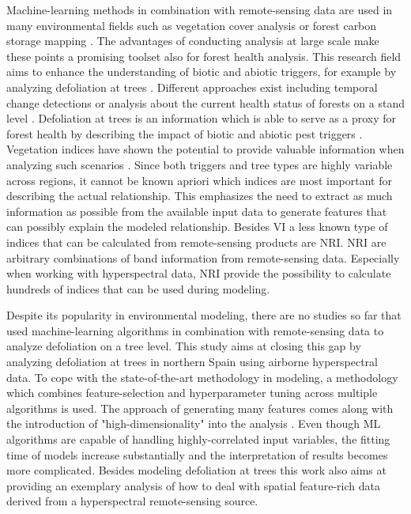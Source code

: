 \documentclass[review]{elsarticle}
\begin{document}
Machine-learning methods in combination with remote-sensing data are used in many environmental fields such as vegetation cover analysis or forest carbon storage mapping \citep{mascaro2014, urban2018}.
The advantages of conducting analysis at large scale make these points a promising toolset also for forest health analysis.
This research field aims to enhance the understanding of biotic and abiotic triggers, for example by analyzing defoliation at trees \citep{hawrylo2018}.
Different approaches exist including temporal change detections \citep{zhang2016} or analysis about the current health status of forests on a stand level \citep{townsend2012}.
Defoliation at trees is an information which is able to serve as a proxy for forest health by describing the impact of biotic and abiotic pest triggers \citep{townsend2012, goodbody2018}.
Vegetation indices have shown the potential to provide valuable information when analyzing such scenarios \citep{jiang2014, adamczyk2015}.
Since both triggers and tree types are highly variable across regions, it cannot be known apriori which indices are most important for describing the actual relationship.
This emphasizes the need to extract as much information as possible from the available input data to generate features that can possibly explain the modeled relationship.
Besides \ac{VI} a less known type of indices that can be calculated from remote-sensing products are \ac{NRI}.
\ac{NRI} are arbitrary combinations of band information from remote-sensing data.
Especially when working with hyperspectral data, \ac{NRI} provide the possibility to calculate hundreds of indices that can be used during modeling.


Despite its popularity in environmental modeling, there are no studies so far that used machine-learning algorithms in combination with remote-sensing data to analyze defoliation on a tree level.
This study aims at closing this gap by analyzing defoliation at trees in northern Spain using airborne hyperspectral data.
To cope with the state-of-the-art methodology in modeling, a methodology which combines feature-selection and hyperparameter tuning across multiple algorithms is used.
The approach of generating many features comes along with the introduction of "high-dimensionality" into the analysis \citep{trunk1979, xu2016}.
Even though \ac{ML} algorithms are capable of handling highly-correlated input variables, the fitting time of models increase substantially and the interpretation of results becomes more complicated.
Besides modeling defoliation at trees this work also aims at providing an exemplary analysis of how to deal with spatial feature-rich data derived from a hyperspectral remote-sensing source.
\end{document}
